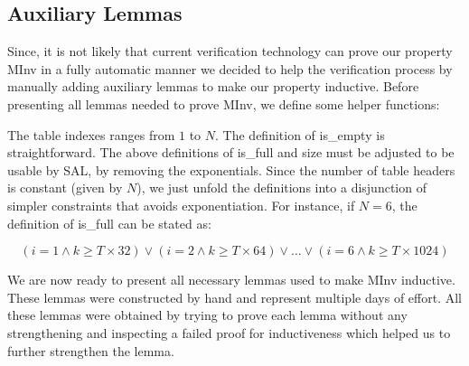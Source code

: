 \subsection{Auxiliary Lemmas}

Since, it is not likely that current verification technology can prove
our property \textsf{MInv} in a fully automatic manner we decided to
help the verification process by manually adding auxiliary lemmas to
make our property inductive.
%
Before presenting all lemmas needed to prove \textsf{MInv}, we
define some helper functions:

\begin{minipage}{\linewidth}
\vspace{3mm}
\vspace{3mm}
\end{minipage}


\noindent The table indexes ranges from $1$ to $N$. The definition of
\textsf{is\_empty} is straightforward. The above definitions of
\textsf{is\_full} and \textsf{size} must be adjusted to be usable by
SAL, by removing the exponentials. Since the number of table headers
is constant (given by $N$), we just unfold the definitions into a
disjunction of simpler constraints that avoids exponentiation. For
instance, if $N=6$, the definition of \textsf{is\_full}
can be stated as:

\[ (i=1 \wedge k \geq T \times 32) \vee (i=2 \wedge k \geq T \times 64) \vee \ldots \vee (i=6 \wedge k \geq T \times 1024) \]

We are now ready to present all necessary lemmas used to make
\textsf{MInv} inductive. These lemmas were constructed by hand and
represent multiple days of effort. All these lemmas were obtained by
trying to prove each lemma without any strengthening and inspecting a
failed proof for inductiveness which helped us to further strengthen
the lemma.

